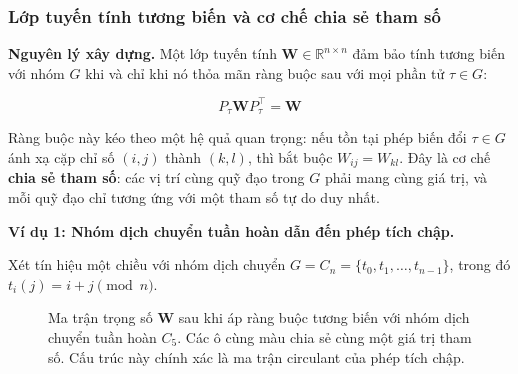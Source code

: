 
\subsubsection{Lớp tuyến tính tương biến và cơ chế chia sẻ tham số}
\label{subsubsec:linear-equivariant}

\textbf{Nguyên lý xây dựng.} Một lớp tuyến tính $\mathbf{W} \in \mathbb{R}^{n \times n}$ đảm bảo tính tương biến với nhóm $G$ khi và chỉ khi nó thỏa mãn ràng buộc sau với mọi phần tử $\tau \in G$:

\begin{equation}
    P_\tau \mathbf{W} P_\tau^\top = \mathbf{W}
    \label{eq:equivariance-constraint}
\end{equation}

Ràng buộc này kéo theo một hệ quả quan trọng: nếu tồn tại phép biến đổi $\tau \in G$ ánh xạ cặp chỉ số $(i,j)$ thành $(k,l)$, thì bắt buộc $W_{ij} = W_{kl}$. Đây là cơ chế \textbf{chia sẻ tham số}: các vị trí cùng quỹ đạo trong $G$ phải mang cùng giá trị, và mỗi quỹ đạo chỉ tương ứng với một tham số tự do duy nhất.

\vspace{0.5em}
\textbf{Ví dụ 1: Nhóm dịch chuyển tuần hoàn dẫn đến phép tích chập.}

Xét tín hiệu một chiều với nhóm dịch chuyển $G = C_n = \{t_0, t_1, \ldots, t_{n-1}\}$, trong đó $t_i(j) = i + j \pmod{n}$.

\begin{figure}[H]
\centering
{}
\caption{Ma trận trọng số $\mathbf{W}$ sau khi áp ràng buộc tương biến với nhóm dịch chuyển tuần hoàn $C_5$. Các ô cùng màu chia sẻ cùng một giá trị tham số. Cấu trúc này chính xác là ma trận circulant của phép tích chập.}
\label{fig:circulant-matrix}
\end{figure}

